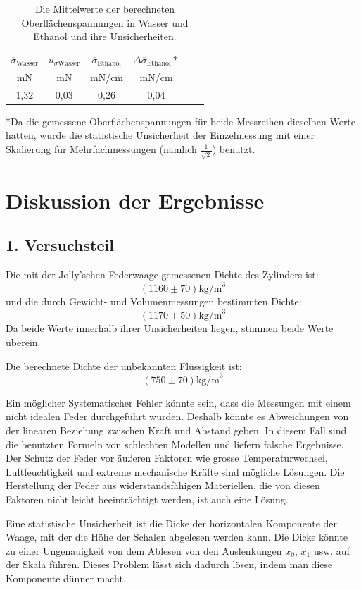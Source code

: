 \documentclass[11pt,a4paper]{article} %
\begin{document}
\begin{table}[h]
	\begin{tabular*}{0.99\textwidth}{@{\extracolsep{\fill}}cccccc}
		\toprule
		$\overline{\sigma}_{\textrm{Wasser}}$ & $u_{\overline{\sigma}\textrm{Wasser}}$ & $\overline{\sigma}_{\textrm{Ethanol}}$ & $\Delta\overline{\sigma}_{\textrm{Ethanol}}*$  \\
		mN & mN &  mN/cm & mN/cm   \\
		\midrule
		1,32 & 0,03 & 0,26  & 0,04 \\
		
		\bottomrule
	\end{tabular*}
	\caption{Die Mittelwerte der berechneten Oberflächenspannungen in Wasser und Ethanol und ihre Unsicherheiten.}
	\label{tabelle7}
\end{table}
*Da die gemessene Oberflächenspannungen für beide Messreihen dieselben Werte hatten, wurde die statistische Unsicherheit der Einzelmessung mit einer Skalierung für Mehrfachmessungen (nämlich $\frac{1}{\sqrt{2}}$) benutzt.

\section{Diskussion der Ergebnisse}
\subsection{1. Versuchsteil}
Die mit der Jolly'schen Federwaage gemessenen Dichte des Zylinders ist:
$$(1160\pm 70)\textrm{kg/m}^3$$
und die durch Gewicht- und Volumenmessungen bestimmten Dichte:
$$(1170\pm 50)\textrm{kg/m}^3$$
Da beide Werte innerhalb ihrer Unsicherheiten liegen, stimmen beide Werte überein. 

Die berechnete Dichte der unbekannten Flüssigkeit ist:
$$(750 \pm 70) \textrm{kg/m}^3$$

Ein möglicher Systematischer Fehler könnte sein, dass die Messungen mit einem nicht idealen Feder durchgeführt wurden. Deshalb könnte es Abweichungen von der linearen Beziehung zwischen Kraft und Abstand geben. In diesem Fall sind die benutzten Formeln von schlechten Modellen und liefern falsche Ergebnisse. Der Schutz der Feder vor äußeren Faktoren wie grosse 
Temperaturwechsel, Luftfeuchtigkeit und extreme mechanische Kräfte sind mögliche Lösungen. Die Herstellung der Feder aus widerstandsfähigen Materiellen, die von diesen Faktoren nicht leicht beeinträchtigt werden, ist auch eine Lösung. 


Eine statistische Unsicherheit ist die Dicke der horizontalen Komponente der Waage, mit der die Höhe der Schalen abgelesen werden kann. Die Dicke könnte zu einer Ungenauigkeit von dem Ablesen von den Auslenkungen $x_0$, $x_1$ usw. auf der Skala führen. Dieses Problem lässt sich dadurch lösen, indem man diese Komponente dünner macht. 
\end{document}
